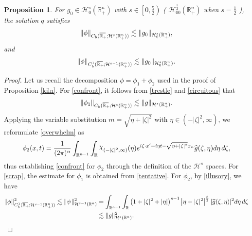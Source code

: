 \documentclass[preprint,compress,12pt]{elsarticle}
\newtheorem{proposition}[theorem]{Proposition}
\numberwithin{equation}{section}
\begin{document}
\begin{proposition}\label{vilify}
	For  $g_{0}\in\mathcal{H}_{0}^{s}(\mathbb{R}^{n}_{+})$ with $s\in\left[0,\frac{5}{2}\right)$ (  $\mathcal{H}^{\frac{1}{2}}_{00}(\mathbb{R}^{n}_{+})$ when $s=\frac{1}{2}$ ), the solution $q$ satisfies
	\begin{equation}\label{confront}
		\|\phi\|_{C_{b}(\overline{\mathbb{R}_{+}\mkern-4mu}\,;\mathcal{H}^{s}(\mathbb{R}_{+}^{n}) )}\lesssim \|g_{0}\|_{\mathcal{H}_{0}^{s}(\mathbb{R}_{+}^{n})},
	\end{equation}
	and
	\begin{equation}\label{scrap} \|\phi\|_{C_{b}^{1}(\overline{\mathbb{R}_{+}\mkern-4mu}\,;\mathcal{H}^{s-1}(\mathbb{R}_{+}^{n}) )}\lesssim \|g_{0}\|_{\mathcal{H}_{0}^{s}(\mathbb{R}_{+}^{n})}.
	\end{equation}
\end{proposition}
\begin{proof}
	Let us recall the decomposition $\phi=\phi_{1}+\phi_{2}$ used in the proof of Proposition \ref{kiln}. For \eqref{confront}, it follows  from \eqref{trestle} and \eqref{circuitous} that
	\begin{equation*}
		\|\phi_{1}\|_{C_{b}(\overline{\mathbb{R}_{+}\mkern-4mu}\,;\mathcal{H}^{s}(\mathbb{R}_{+}^{n}) )}\lesssim \|g\|_{\mathcal{H}^{s}(\mathbb{R}_{+}^{n})}.
	\end{equation*}
	Applying the variable substitution $m=\sqrt{\eta+|\zeta|^{2}}$ with $\eta\in(-|\zeta|^{2},\infty)$, we reformulate \eqref{overwhelm} as
	\begin{equation}\label{illusory}
		\phi_{2}(x,t)=\frac{1}{(2\pi)^{n}}\int_{\mathbb{R}^{n-1}} \int_{\mathbb{R}}  \raisebox{0.5ex}{$\chi$}_{(-|\zeta|^{2},\infty)}(\eta)e^{i\zeta\cdot x'+i\eta t-\sqrt{\eta+|\zeta|^{2}}x_{n}} \widehat{g}(\zeta,\eta)d\eta\, d\zeta,
	\end{equation}
	thus establishing \eqref{confront} for $\phi_{2}$ through the definition of the $\mathcal{H}^{s}$ spaces.
	For \eqref{scrap}, the estimate for $\phi_{1}$ is obtained from \eqref{tentative}. For $\phi_{2}$, by \eqref{illusory}, we have
	\begin{equation*}
		\begin{aligned} \|\phi\|_{C_{b}^{1}(\overline{\mathbb{R}_{+}\mkern-4mu}\,;\mathcal{H}^{s-1}(\mathbb{R}_{+}^{n}) )}^{2}\lesssim \|\psi\|_{\mathcal{H}^{s-1}(\mathbb{R}^{n})}^{2}
			&=\int_{\mathbb{R}^{n-1}}\int_{\mathbb{R}}  \left(1+|\zeta|^{2}+|\eta|\right)^{s-1} \left|\eta+|\zeta|^{2}\right|^{\frac{3}{2}}|\widehat{g}(\zeta,\eta)|^{2}d\eta \, d\zeta\\
			& \lesssim \|g\|_{\mathcal{H}^{s}(\mathbb{R}^{n})}^{2}.
		\end{aligned}
	\end{equation*}
\end{proof}
\end{document}
